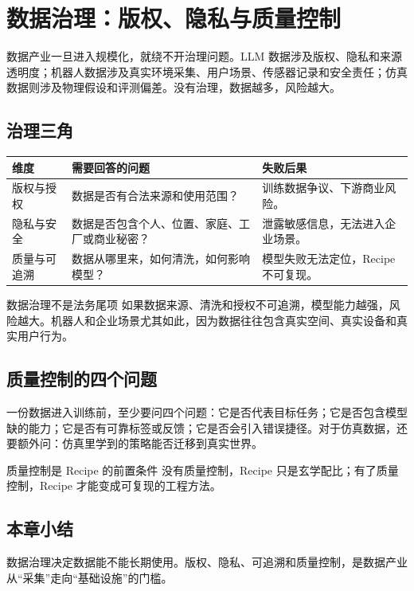 \section{数据治理：版权、隐私与质量控制}

数据产业一旦进入规模化，就绕不开治理问题。LLM 数据涉及版权、隐私和来源透明度；机器人数据涉及真实环境采集、用户场景、传感器记录和安全责任；仿真数据则涉及物理假设和评测偏差。没有治理，数据越多，风险越大。

\subsection{治理三角}

\noindent\begin{longtable}{p{}p{}p{}}
\toprule
维度 & 需要回答的问题 & 失败后果 \\
\midrule
版权与授权 & 数据是否有合法来源和使用范围？ & 训练数据争议、下游商业风险。 \\
隐私与安全 & 数据是否包含个人、位置、家庭、工厂或商业秘密？ & 泄露敏感信息，无法进入企业场景。 \\
质量与可追溯 & 数据从哪里来，如何清洗，如何影响模型？ & 模型失败无法定位，Recipe 不可复现。 \\
\bottomrule
\end{longtable}

\begin{warningbox}{数据治理不是法务尾项}
如果数据来源、清洗和授权不可追溯，模型能力越强，风险越大。机器人和企业场景尤其如此，因为数据往往包含真实空间、真实设备和真实用户行为。
\end{warningbox}

\subsection{质量控制的四个问题}

一份数据进入训练前，至少要问四个问题：它是否代表目标任务；它是否包含模型缺的能力；它是否有可靠标签或反馈；它是否会引入错误捷径。对于仿真数据，还要额外问：仿真里学到的策略能否迁移到真实世界。

\begin{importantbox}{质量控制是 Recipe 的前置条件}
没有质量控制，Recipe 只是玄学配比；有了质量控制，Recipe 才能变成可复现的工程方法。
\end{importantbox}

\subsection{本章小结}

数据治理决定数据能不能长期使用。版权、隐私、可追溯和质量控制，是数据产业从“采集”走向“基础设施”的门槛。

